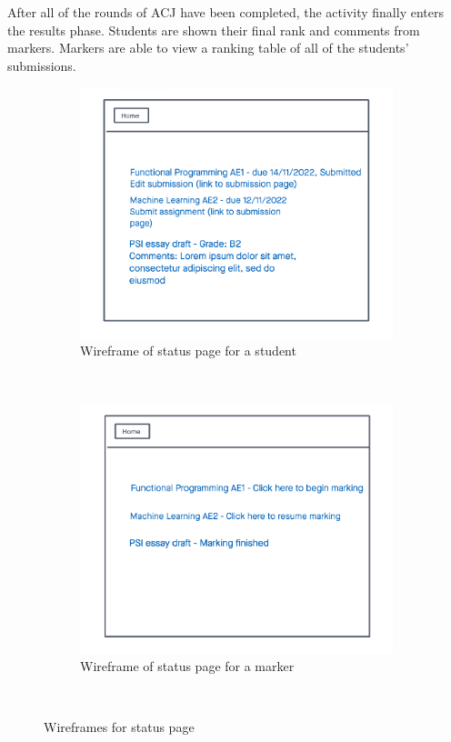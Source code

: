 \documentclass{l4proj}
\begin{document}
After all of the rounds of ACJ have been completed, the activity finally enters the results phase. Students are shown their final rank and comments from markers. Markers are able to view a ranking table of all of the students’ submissions.

\begin{figure}[h]
    \centering
    \begin{subfigure}[b]{0.45\textwidth}
        \includegraphics[width=\textwidth]{images/w-status-student.png}
        \caption{Wireframe of status page for a student}
        \label{fig:syn1}
    \end{subfigure}
    ~ %
    \begin{subfigure}[b]{0.45\textwidth}
        \includegraphics[width=\textwidth]{images/w-status-marker.png}
        \caption{Wireframe of status page for a marker}
        \label{fig:syn2}
    \end{subfigure}
    ~ %
    \caption{Wireframes for status page}
\end{figure}
\end{document}
